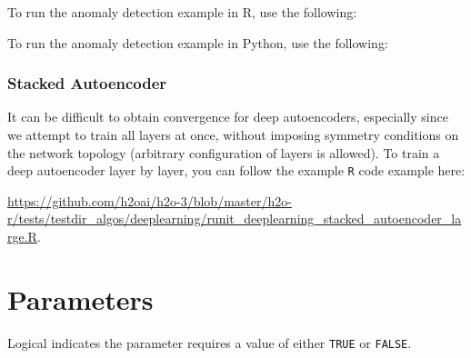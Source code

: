 {{%
%
%                              
%                              
%
%
\waterExampleInR
To run the anomaly detection example in R, use the following: 


\waterExampleInPython
To run the anomaly detection example in Python, use the following: 


\noindent

\subsubsection{Stacked Autoencoder}
It can be difficult to obtain convergence for deep autoencoders, especially since we attempt to train all layers at once, without imposing symmetry conditions on the network topology (arbitrary configuration of layers is allowed). To train a deep autoencoder layer by layer, you can follow the example \texttt{R} code example here:
{\url{https://github.com/h2oai/h2o-3/blob/master/h2o-r/tests/testdir_algos/deeplearning/runit_deeplearning_stacked_autoencoder_large.R}.


\section{Parameters}
\label{sec:Parameters}

Logical indicates the parameter requires a value of either \texttt{TRUE} or \texttt{FALSE}. 

}}}
